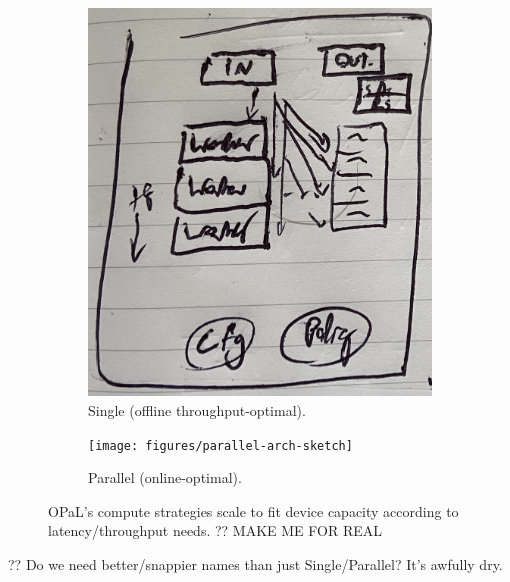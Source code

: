 \documentclass[sigconf,natbib=false]{acmart}
\newcommand{\approachshort}{OPaL}
\begin{document}
\begin{figure}
	\begin{subfigure}{0.3\linewidth}
		\centering
		\includegraphics[keepaspectratio, width=\linewidth]{figures/single-core-arch-sketch}
		\caption{Single (offline throughput-optimal).\label{fig:single-and-parallel:single}}
	\end{subfigure}
	\begin{subfigure}{0.45\linewidth}
		\centering
		\texttt{[image: figures/parallel-arch-sketch]}
		\caption{Parallel (online-optimal).\label{fig:single-and-parallel:parallel}}
	\end{subfigure}
	\caption{\approachshort{}'s compute strategies scale to fit device capacity according to latency/throughput needs. ?? MAKE ME FOR REAL \label{fig:single-and-parallel}}
\end{figure}

?? Do we need better/snappier names than just Single/Parallel? It's awfully dry.
\end{document}
